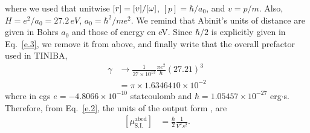 \documentclass[floatfix,prb,aps,superscriptaddress,11pt]{revtex4}
\begin{document}
where we used that unitwise $[r]=[v]/[\omega]$, $[p]=\hbar/a_0$, and $v=p/m$.
Also, $H=e^2/a_0=27.2\,eV$, $a_0=\hbar^2/me^2$. We remind that Abinit\Reg's 
units of distance are given in Bohrs $a_0$ and those of energy en eV.
Since $\hbar/2$ is explicitly given in Eq.~\eqref{e.3}, we remove it
from above, and finally write that 
the overall prefactor used in TINIBA\Reg,
\begin{align}\label{e.5}
\gamma&\to
\frac{1}{27\times 10^{13}}
\frac{\pi e^2}{\hbar}(27.21)^3 
\nonumber\\
&=\pi\times 1.6346410\times 10^{-2}
\end{align}
where in cgs
$e=-4.8066\times 10^{-10}$ statcoulomb and $\hbar=1.05457\times 
10^{-27}$ erg$\cdot$s.
Therefore, from Eq.~\eqref{e.2}, the units of the output form \tiniba, are
\begin{align}\label{e.6}
[\mu^{\mathrm{abcd}}_{\mathrm{S.I.}}]&=
\frac{\hbar}{2} \frac{1}{V^2s^2}. 
\end{align} 
\end{document}
